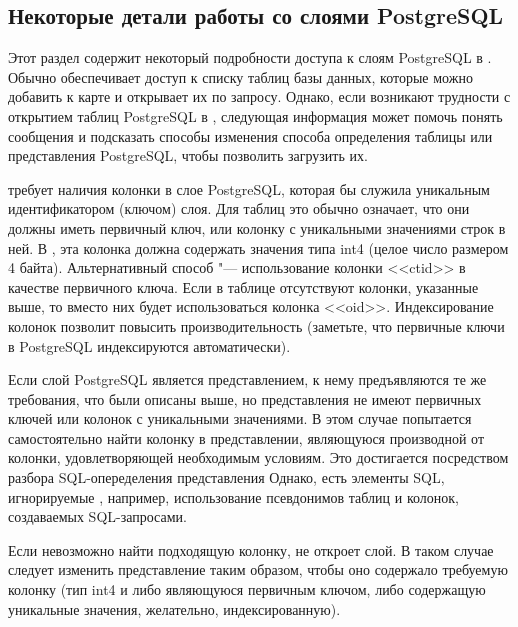 \subsection{Некоторые детали работы со слоями PostgreSQL}
\label{sec:postgis_details}

Этот раздел содержит некоторый подробности доступа к слоям PostgreSQL в \qg.
Обычно \qg обеспечивает доступ к списку таблиц базы данных, которые можно
добавить к карте и открывает их по запросу. Однако, если возникают трудности
с открытием таблиц PostgreSQL в \qg, следующая информация может помочь
понять сообщения \qg и подсказать способы изменения способа определения
таблицы или представления PostgreSQL, чтобы позволить \qg загрузить их.

\qg требует наличия колонки в слое PostgreSQL, которая бы служила уникальным
идентификатором (ключом) слоя. Для таблиц это обычно означает, что они должны
иметь первичный ключ, или колонку с уникальными значениями строк в ней.
В \qg, эта колонка должна содержать значения типа int4 (целое число размером
4 байта). Альтернативный способ "--- использование колонки <<ctid>> в качестве
первичного ключа. Если в таблице отсутствуют колонки, указанные выше, то
вместо них будет использоваться колонка <<oid>>. Индексирование колонок позволит
повысить производительность (заметьте, что первичные ключи в PostgreSQL
индексируются автоматически).

Если слой PostgreSQL является представлением, к нему предъявляются те же
требования, что были описаны выше, но представления не имеют первичных
ключей или колонок с уникальными значениями. В этом случае \qg попытается
самостоятельно найти колонку в представлении, являющуюся производной от
колонки, удовлетворяющей необходимым условиям. %
Это достигается посредством разбора SQL-опеределения представления %
Однако, есть элементы SQL, игнорируемые \qg, например, использование
псевдонимов таблиц и колонок, создаваемых SQL-запросами.

Если невозможно найти подходящую колонку, \qg не откроет слой. В таком
случае следует изменить представление таким образом, чтобы оно содержало
требуемую колонку (тип int4 и либо являющуюся первичным ключом, либо
содержащую уникальные значения, желательно, индексированную).

